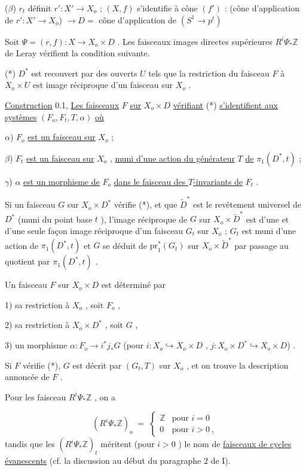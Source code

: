 ($\beta$) $r_t$ définit $r' : X' \longrightarrow X_o$ ; $(X, f)$ s'identifie à
cône $(f')$ : (cône d'application de $r' : X' \longrightarrow X_o$) $\longrightarrow D =$ cône d'application de $(S^1 \to p^t)$

Soit $\Psi = (r, f) : X \longrightarrow X_o \times D$ . Les faisceaux images directes supérieures $R^i \Psi_* \mathbb{Z}$ de Leray vérifient la condition suivante.

(*)  $D^*$ est recouvert par des ouverts $U$ tels que la restriction du faisceau $F$ à $X_o \times U$ est image réciproque d'un faisceau sur $X_o$ .

\underline{Construction} 0.1, \underline{Les faisceaux} $F$ \underline{sur} $X_o \times D$ \underline{vérifiant} (*) \underline{s'identifient aux systèmes} $(F_o, F_t, T, \alpha)$ \underline{où}

$\alpha$)  $F_o$  \underline{est un faisceau sur} $X_o$  ;

$\beta$)  $F_t$  \underline{est un faisceau sur} $X_o$  , \underline{muni d'une action du générateur} $T$ \underline{de} $\pi_1(D^*,t)$ ;

$\gamma$)  $\alpha$  \underline{est un morphisme de} $F_o$ \underline{dans le faisceau des $T$-invariants de} $F_t$ .

Si un faisceau $G$ sur $X_o \times D^*$ vérifie (*), et que $\widetilde{D}^*$ est le revêtement universel de $D^*$ (muni du point base $t$ ), l'image réciproque de $G$ sur $X_o \times \widetilde{D}^*$ est d'une et d'une seule façon image réciproque d'un faisceau $G_t$ sur $X_o$  ; $G_t$ est muni d'une action de $\pi_1(D^*, t)$ et $G$ se déduit de $\mathrm{pr}_1^*(G_t)$ sur $X_o \times \widetilde{D}^*$ par passage au quotient par $\pi_1(D^*, t)$ .

Un faisceau $F$ sur $X_o \times D$ est déterminé par

1) sa restriction à $X_o$ , soit $F_o$ ,

2) sa restriction à $X_o \times D^*$ , soit $G$ ,

3) un morphisme $\alpha : F_o \longrightarrow i^*j_*G$ (pour $i : X_o \hookrightarrow X_o \times D$ , $j : X_o \times D^* \hookrightarrow X_o \times D$) .

Si $F$ vérifie (*), $G$ est décrit par $(G_t, T)$ sur $X_o$ , et on trouve la description annoncée de $F$ .

Pour les faisceau $R^i \Psi_* \mathbb{Z}$ , on a

\begin{equation*}
(R^i \Psi_* \mathbb{Z})_o \;=\; \begin{cases} \mathbb{Z} & \text{pour } i = 0 \\ 0 & \text{pour } i > 0 \ , \end{cases}
\end{equation*}
tandis que les $(R^i \Psi_* \mathbb{Z} )_t$ méritent (pour $i > 0$ ) le nom de \underline{faisceaux de cycles évanescents} (cf. la discussion au début du paragraphe 2 de I).


